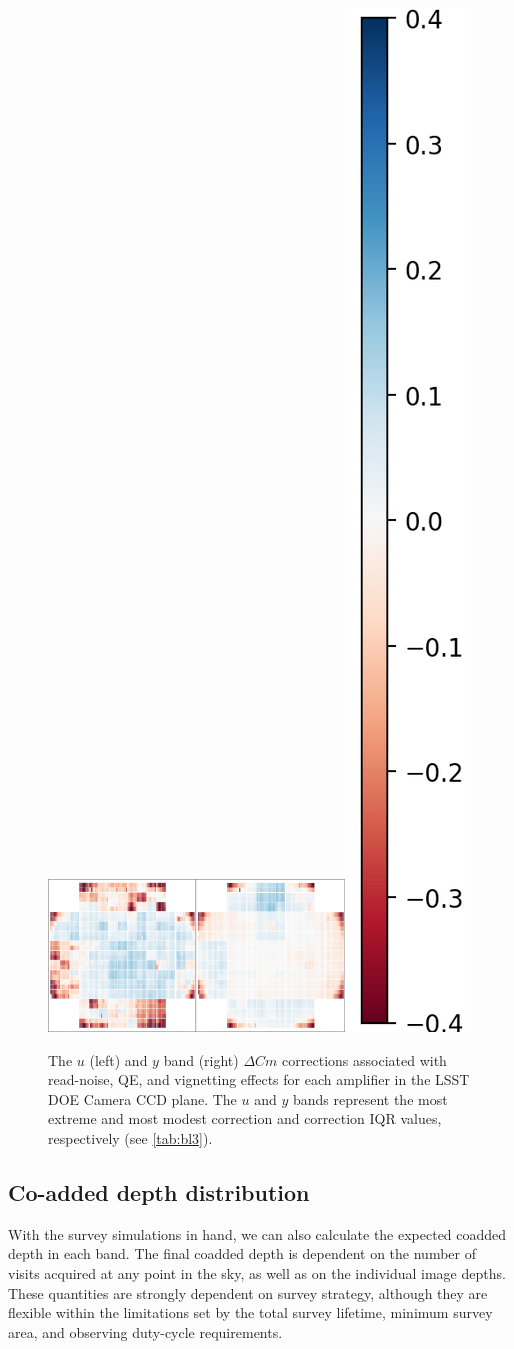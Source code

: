 \documentclass[PST,authoryear,toc]{lsstdoc}
\begin{document}
\begin{figure}[!hb]
    \centering

    \includegraphics[width=0.35\textwidth]{figures/ccdplaneU}\includegraphics[width=0.35\textwidth]{figures/ccdplaneY}\includegraphics[height=0.36\textwidth]{figures/colorbar.png}
\caption{The $u$ (left) and $y$ band (right) $\Delta Cm$ corrections associated with read-noise, QE, and vignetting effects for each amplifier in the LSST DOE Camera CCD plane. The $u$ and $y$ bands represent the most extreme and most modest correction and correction IQR values, respectively (see \autoref{tab:bl3}).}\label{fig:ccdplane}
\end{figure}
 \FloatBarrier





\subsection{Co-added depth distribution}\label{sec:coadd}

With the survey simulations in hand, we can also calculate the expected coadded depth in each band. The final coadded depth is dependent on the number of visits acquired at any point in the sky, as well as on the individual image depths. These quantities are strongly dependent on survey strategy, although they are flexible within the limitations set by the total survey lifetime, minimum survey area, and observing duty-cycle requirements.
\end{document}

